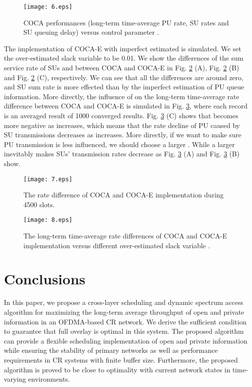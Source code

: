\documentclass[journal]{IEEEtran}
\begin{document}
\begin{figure}
\centering
\texttt{[image: 6.eps]}
\caption{ COCA performances (long-term time-average PU rate, SU rates and SU queuing delay) versus control parameter . }
\label{V-perform}
\end{figure}
The implementation of COCA-E with imperfect estimated  is simulated.  We set the over-estimated slack
variable  to be 0.01. We show the differences of the sum service rate of SUs and  between COCA and COCA-E in Fig.
\ref{rate-diff} (A), Fig. \ref{rate-diff} (B) and Fig. \ref{rate-diff} (C), respectively. We can see that all the
differences are around zero, and SU sum rate is more effected than  by the imperfect estimation of PU queue information. More
directly, the influence of  on  the long-term time-average rate difference between COCA and COCA-E is simulated in Fig.
\ref{epsilon-rate}, where each record is an averaged result of 1000 converged results.  Fig. \ref{epsilon-rate} (C) shows that
 becomes more negative as  increases,
which means that the rate decline of PU caused by SU transmissions decreases as  increases. More directly, if we want
to make sure PU transmission is less influenced, we should choose a larger .   While a larger
 inevitably  makes SUs' transmission rates decrease as  Fig. \ref{epsilon-rate} (A) and Fig.
\ref{epsilon-rate} (B) show.






\begin{figure}
\centering
\texttt{[image: 7.eps]}
\caption{ The rate difference of COCA and COCA-E implementation during 4500 slots. }
\label{rate-diff}
\end{figure}


\begin{figure}
\centering
\texttt{[image: 8.eps]}
\caption{ The long-term time-average rate differences of COCA and COCA-E implementation versus different over-estimated slack
variable  . }
\label{epsilon-rate}
\end{figure}



\section{Conclusions}
In this paper, we propose a cross-layer scheduling and dynamic spectrum access algorithm for maximizing the long-term average throughput  of open and private information in an OFDMA-based CR network. We derive the sufficient condition to guarantee that full overlay is optimal in this system. The proposed algorithm can provide a flexible scheduling implementation of open and private information while ensuring the stability of primary networks as well as performance requirements in CR systems with finite buffer size. Furthermore, the proposed algorithm is proved to be close to optimality with current network states in time-varying environments.
\end{document}
